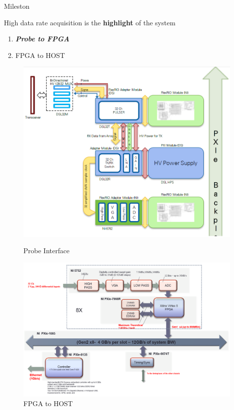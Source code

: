 \documentclass[t,12pt,english
\ifx\beamermode\undefined\else,\beamermode\fi
]{beamer}
\begin{document}
\begin{frame}{Mileston}

\begin{block}{\footnotesize{High data rate acquisition is the \textbf{highlight} of the system}}\tiny{}
\begin{enumerate} 
\vspace{0.05cm}
     \item \tiny{\textbf{\textit{Probe to FPGA}} } 
     \item \tiny{FPGA to HOST}
\end{enumerate}
\end{block}

\begin{figure}[!htb]
\includegraphics[width=.81\textwidth]{2.png}
\caption{\tiny{Probe Interface}}
\endminipage
{}
\centering
\includegraphics[width=1\textwidth]{4.png}
\caption{\tiny{FPGA to HOST} }
\endminipage
\end{figure}

\end{frame}
\end{document}
